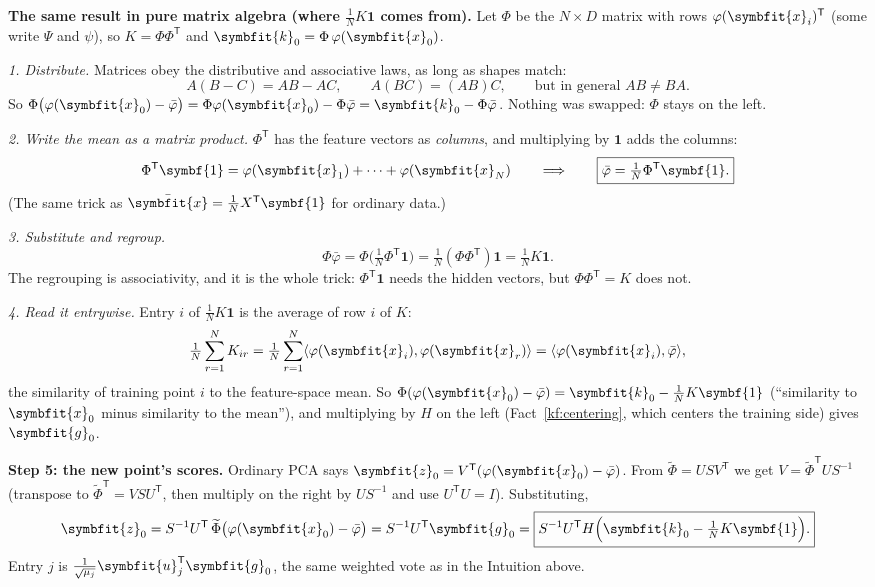 \documentclass[11pt]{article}
\newcommand{\bm}[1]{\symbfit{#1}}
\newcommand{\vx}{\bm{x}}
\newcommand{\vu}{\bm{u}}
\newcommand{\one}{\symbf{1}}
\newcommand{\xbar}{\bar{\bm{x}}}
\newcommand{\T}{^{\mathsf T}}
\begin{document}
\begin{intuition}
\textbf{The same result in pure matrix algebra (where $\tfrac1NK\one$ comes from).} Let $\Phi$ be the $N\times D$ matrix with rows
$\varphi(\vx_i)\T$ (some write $\Psi$ and $\psi$), so $K=\Phi\Phi\T$ and $\bm k_0=\Phi\,\varphi(\vx_0)$.

\emph{1. Distribute.} Matrices obey the distributive and associative laws, as long as shapes match:
\[
A(B-C)=AB-AC,\qquad A(BC)=(AB)C,\qquad\text{but in general } AB\neq BA.
\]
So $\Phi\big(\varphi(\vx_0)-\bar\varphi\big)=\Phi\varphi(\vx_0)-\Phi\bar\varphi=\bm k_0-\Phi\bar\varphi$. Nothing was swapped: $\Phi$ stays on the left.

\emph{2. Write the mean as a matrix product.} $\Phi\T$ has the feature vectors as \emph{columns}, and multiplying by $\one$ adds the columns:
\[
\Phi\T\one=\varphi(\vx_1)+\cdots+\varphi(\vx_N)\qquad\Longrightarrow\qquad \boxed{\bar\varphi=\tfrac1N\Phi\T\one.}
\]
(The same trick as $\xbar=\tfrac1NX\T\one$ for ordinary data.)

\emph{3. Substitute and regroup.}
\[
\Phi\bar\varphi=\Phi\Big(\tfrac1N\Phi\T\one\Big)=\tfrac1N(\Phi\Phi\T)\one=\boxed{\tfrac1NK\one.}
\]
The regrouping is associativity, and it is the whole trick: $\Phi\T\one$ needs the hidden vectors, but $\Phi\Phi\T=K$ does not.

\emph{4. Read it entrywise.} Entry $i$ of $\tfrac1NK\one$ is the average of row $i$ of $K$:
\[
\tfrac1N\sum_{r=1}^NK_{ir}=\tfrac1N\sum_{r=1}^N\langle\varphi(\vx_i),\varphi(\vx_r)\rangle=\langle\varphi(\vx_i),\bar\varphi\rangle,
\]
the similarity of training point $i$ to the feature-space mean. So $\Phi(\varphi(\vx_0)-\bar\varphi)=\bm k_0-\tfrac1NK\one$ (``similarity to $\vx_0$
minus similarity to the mean''), and multiplying by $H$ on the left (Fact~\ref{kf:centering}, which centers the training side) gives $\bm g_0$.
\end{intuition}

\textbf{Step 5: the new point's scores.} Ordinary PCA says $\bm z_0=V\T(\varphi(\vx_0)-\bar\varphi)$. From $\widetilde\Phi=USV\T$ we get
$V=\widetilde\Phi\T US^{-1}$ (transpose to $\widetilde\Phi\T=VSU\T$, then multiply on the right by $US^{-1}$ and use $U\T U=I$). Substituting,
\[
\bm z_0=S^{-1}U\T\,\widetilde\Phi\big(\varphi(\vx_0)-\bar\varphi\big)=S^{-1}U\T\bm g_0
=\boxed{S^{-1}U\T H\Big(\bm k_0-\tfrac1NK\one\Big).}
\]
Entry $j$ is $\tfrac1{\sqrt{\mu_j}}\vu_j\T\bm g_0$, the same weighted vote as in the Intuition above.
\end{document}
